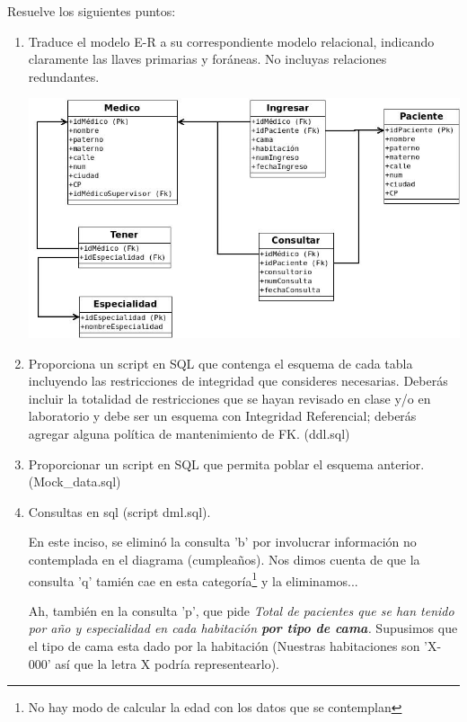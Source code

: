 \documentclass{article}
\begin{document}
    Resuelve los siguientes puntos:
    \begin{enumerate}
    	\item Traduce el modelo E-R a su correspondiente modelo relacional, indicando claramente las llaves
    	primarias y foráneas. No incluyas relaciones redundantes.\\
    	
    	\begin{center}
    		\includegraphics[width=1\textwidth]{DiagramaRelacional.jpeg}
    	\end{center}
        \item Proporciona un script en SQL que contenga el esquema de cada tabla incluyendo las restricciones
    	de integridad que consideres necesarias. Deberás incluir la totalidad de restricciones que se hayan
    	revisado en clase y/o en laboratorio y debe ser un esquema con Integridad Referencial; deberás
    	agregar alguna política de mantenimiento de FK. (ddl.sql)
    	
        \item Proporcionar un script en SQL que permita poblar el esquema anterior. (Mock\_data.sql)
        
        \item Consultas en sql (script dml.sql).
        
        En este inciso, se eliminó la consulta 'b' por involucrar información no contemplada en el diagrama
        (cumpleaños). Nos dimos cuenta de que la consulta 'q' tamién cae en esta categoría\footnote{No hay 
        modo de calcular la edad con los datos que se contemplan} y la eliminamos...
        
        Ah, también en la consulta 'p', que pide \textit{Total de pacientes que se han tenido por año y 
        especialidad en cada habitación \textbf{por tipo de cama}.} Supusimos que el tipo de cama esta dado
        por la habitación (Nuestras habitaciones son 'X-000' así que la letra X podría representearlo).
        

\end{enumerate}
\end{document}
